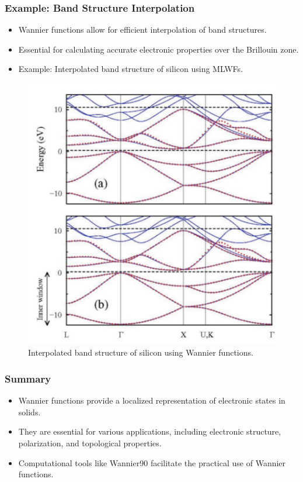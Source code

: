 \documentclass{CustomBeamer}
\begin{document}
    \begin{frame}
    \frametitle{Example: Band Structure Interpolation}
    \begin{itemize}
        \item Wannier functions allow for efficient interpolation of band structures.
        \item Essential for calculating accurate electronic properties over the Brillouin zone.
        \item Example: Interpolated band structure of silicon using MLWFs.
    \end{itemize}
    \begin{figure}
        \centering
        \includegraphics[width=0.3\linewidth]{band_structure.png}
        \caption{Interpolated band structure of silicon using Wannier functions.}
    \end{figure}
    \end{frame}
    

    
    \begin{frame}
    \frametitle{Summary}
    \begin{itemize}
        \item Wannier functions provide a localized representation of electronic states in solids.
        \item They are essential for various applications, including electronic structure, polarization, and topological properties.
        \item Computational tools like Wannier90 facilitate the practical use of Wannier functions.
    \end{itemize}
    \end{frame}
\end{document}
